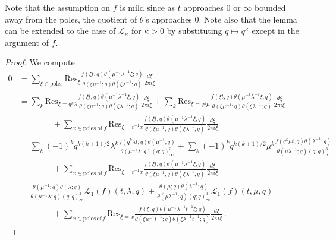 \documentclass[12pt,reqno]{amsart}
\theoremstyle{definition}
\def\Res{\mathrm{Res}}
\def\be{\begin{equation}}
\def\ee{\end{equation}}
\def\Lap{\mathcal{L}}
\begin{document}
Note that the assumption on $f$ is mild since as $t$ approaches $0$ or $\infty$
bounded away from the poles, the quotient of $\theta$'s approaches $0$. Note
also that the lemma can be extended to the case of $\mathcal{L}_{\kappa}$ for
$\kappa >0$ by substituting $q\mapsto q^{\kappa}$ except in the argument of $f$. 

\begin{proof}
We compute  
\be
\begin{aligned}
0&=
\sum_{\xi\in \mathrm{poles}}\Res_{\xi}\frac{f(\xi t,q)\theta(\mu^{-1}
  \lambda^{-1}\xi;q)}{\theta(\xi\mu^{-1};q)\theta(\xi\lambda^{-1};q)}
\frac{d\xi}{2\pi i\xi}\\
&=
\sum_{k}\Res_{\xi=q^{k}\lambda}\frac{f(\xi t,q)
  \theta(\mu^{-1}\lambda^{-1}\xi;q)}{\theta(\xi\mu^{-1};q)
  \theta(\xi\lambda^{-1};q)}\frac{d\xi}{2\pi i\xi}
+\sum_{k}\Res_{\xi=q^{k}\mu}\frac{f(\xi t,q)
  \theta(\mu^{-1}\lambda^{-1}\xi;q)}{\theta(\xi\mu^{-1};q)
  \theta(\xi\lambda^{-1};q)}\frac{d\xi}{2\pi i\xi}\\
&\qquad\qquad+\sum_{x\in \mathrm{poles\;of}\;f}\Res_{\xi=t^{-1}x}
\frac{f(\xi t,q)\theta(\mu^{-1}\lambda^{-1}\xi;q)}{\theta(\xi\mu^{-1};q)
  \theta(\xi\lambda^{-1};q)}\frac{d\xi}{2\pi i\xi}\\
&=
\sum_{k}(-1)^{k}q^{k(k+1)/2}\lambda^{k}
\frac{f(q^{k}\lambda t,q)
  \theta(\mu^{-1};q)}{\theta(\mu^{-1}\lambda;q)(q;q)_{\infty}^{3}}
+\sum_{k}(-1)^{k}q^{k(k+1)/2}\mu^{k}
\frac{f(q^{k}\mu t,q)\theta(\lambda^{-1};q)}{\theta(\mu\lambda^{-1};q)
  (q;q)_{\infty}^{3}}\\
&\qquad\qquad+\sum_{x\in \mathrm{poles\;of}\;f}\Res_{\xi=t^{-1}x}
\frac{f(\xi t,q)\theta(\mu^{-1}\lambda^{-1}\xi;q)}{\theta(\xi\mu^{-1};q)
  \theta(\xi\lambda^{-1};q)}\frac{d\xi}{2\pi i\xi}\\
&=
\frac{\theta(\mu^{-1};q)\theta(\lambda;q)}{\theta(\mu^{-1}\lambda;q)
  (q;q)_{\infty}^{3}}\Lap_{1}(f)(t,\lambda,q)
+\frac{\theta(\mu;q)\theta(\lambda^{-1};q)}{\theta(\mu\lambda^{-1};q)
  (q;q)_{\infty}^{3}}\Lap_{1}(f)(t,\mu,q)\\
&\qquad\qquad+\sum_{x\in \mathrm{poles\,of}\,f}\Res_{\xi=x}
\frac{f(\xi,q)\theta(\mu^{-1}\lambda^{-1}t^{-1}\xi;q)}{\theta(\xi\mu^{-1}t^{-1};q)
  \theta(\xi\lambda^{-1}t^{-1};q)}\frac{d\xi}{2\pi i\xi} \,.
\end{aligned}
\ee
\end{proof}
\end{document}
